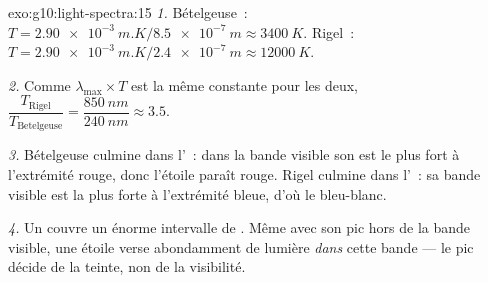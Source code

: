 \begin{solution}{exo:g10:light-spectra:15}
\emph{1.} Bételgeuse~:
$T = \qty{2.90e-3}{m.K} / \qty{8.5e-7}{m} \approx \qty{3400}{K}$. Rigel~:
$T = \qty{2.90e-3}{m.K} / \qty{2.4e-7}{m} \approx \qty{12000}{K}$.

\emph{2.} Comme $\lambda_{\max} \times T$ est la même constante pour les
deux,
$\dfrac{T_{\text{Rigel}}}{T_{\text{Betelgeuse}}}
= \dfrac{\qty{850}{nm}}{\qty{240}{nm}} \approx 3.5$.

\emph{3.} Bételgeuse culmine dans l'~: dans la bande
visible son  est le plus fort à l'extrémité rouge, donc
l'étoile paraît rouge. Rigel culmine dans l'~: sa bande
visible est la plus forte à l'extrémité bleue, d'où le bleu-blanc.

\emph{4.} Un  couvre un énorme intervalle de
. Même avec son pic hors de la bande visible,
une étoile verse abondamment de lumière \emph{dans} cette bande --- le
pic décide de la teinte, non de la visibilité.
\end{solution}

